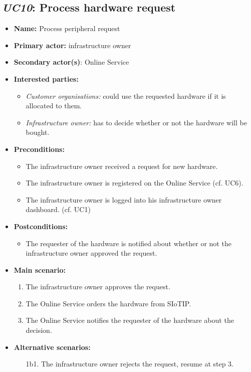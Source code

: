 \documentclass[english]{sareport}
\begin{document}
\subsection{\emph{UC10}: Process hardware request}
\begin{itemize}
    \item \textbf{Name:} Process peripheral request
    \item \textbf{Primary actor:} infrastructure owner
    \item \textbf{Secondary actor(s)}: Online Service
    \item \textbf{Interested parties:} 
        \begin{itemize}
            \item \textit{Customer organisations:} could use the requested hardware if it is allocated to them.
            \item \textit{Infrastructure owner:} has to decide whether or not the hardware will be bought.
        \end{itemize}

    \item \textbf{Preconditions:}
        \begin{itemize}
            \item The infrastructure owner received a request for new hardware.
            \item The infrastructure owner is registered on the Online Service (cf. UC6).
            \item The infrastructure owner is logged into his infrastructure owner dashboard. (cf. UC1)
        \end{itemize}

    \item \textbf{Postconditions:}
        \begin{itemize}
            \item The requester of the hardware is notified about whether or not the infrastructure owner approved the request.
        \end{itemize}
        
    \item \textbf{Main scenario:} 
    \begin{enumerate}
       \item The infrastructure owner approves the request.
       \item The Online Service orders the hardware from SIoTIP.
       \item The Online Service notifies the requester of the hardware about the decision.
    \end{enumerate}

    \item \textbf{Alternative scenarios:} 
    \begin{enumerate}
        \item [1b1.] The infrastructure owner rejects the request, resume at step 3.
    \end{enumerate}
\end{itemize}
\end{document}

